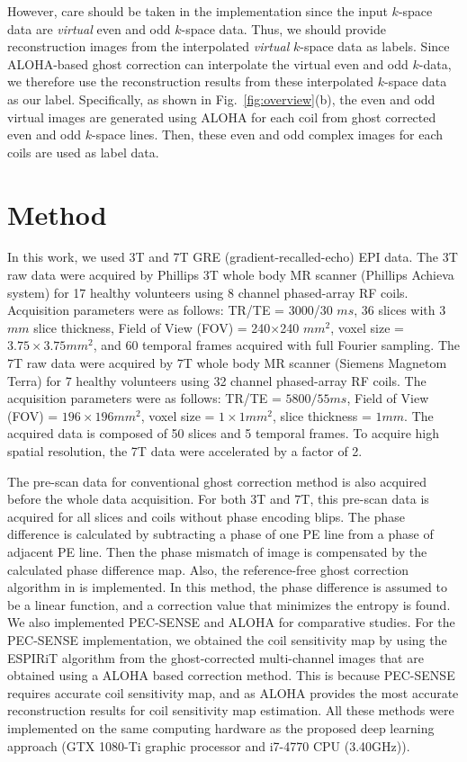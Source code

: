 \documentclass[num-refs]{wiley-article}
\newcommand{\0}{{\boldsymbol{0}}}
\newcommand{\1}{\blmath{1}}
\begin{document}
	However, care should be taken in the implementation since the input $k$-space data are {\em virtual}  even and odd  $k$-space data. Thus, we should provide reconstruction images from the interpolated {\em virtual} $k$-space data as labels. Since ALOHA-based ghost correction can interpolate the virtual even and odd $k$-data, we therefore use the reconstruction results from these interpolated $k$-space data as our label.  Specifically, as shown in Fig.~\ref{fig:overview}(b), the even and odd virtual images are generated using ALOHA for each coil from ghost corrected even and odd $k$-space lines.   Then, these even and odd complex images for each coils  are used as label data. 
	
	
	\section{Method}
	
	
	In this work, we used 3T and 7T GRE (gradient-recalled-echo) EPI data. The 3T raw data were acquired by Phillips 3T whole body MR scanner (Phillips Achieva system) for 17 healthy volunteers using 8 channel phased-array RF coils. Acquisition parameters were as follows: TR/TE = 3000/30 $ms$, 36 slices with 3 $mm$ slice thickness, Field of View (FOV) = 240$\times$240 $mm^2$, voxel size = $3.75\times3.75 mm^2$, and 60 temporal frames acquired with full Fourier sampling. The 7T raw data were acquired by 7T whole body MR scanner (Siemens Magnetom Terra) for 7 healthy volunteers using 32 channel phased-array RF coils. The acquisition parameters were as follows: TR/TE = $5800/55 ms$, Field of View (FOV) = $196\times196 mm^2$, voxel size = $1\times1 mm^2$, slice thickness = $1 mm$. The acquired data is composed of 50 slices and 5 temporal frames. To acquire high spatial resolution, the 7T data were accelerated by a factor of 2.
	
	The pre-scan data for conventional ghost correction method is also acquired before the whole data acquisition. For both 3T and 7T, this pre-scan data is acquired for all slices and coils without phase encoding blips. The phase difference is calculated by subtracting a phase of one PE line from a phase of adjacent PE line. Then the phase mismatch of image is compensated by the calculated phase difference map. 
	Also, the reference-free ghost correction algorithm in \cite{skare2006afast} is implemented. 
	In this method, the phase difference is assumed to be a linear function, and a correction value that minimizes the entropy is found. We also implemented PEC-SENSE \cite{xie2018robust} and ALOHA for comparative studies.  For the PEC-SENSE implementation, we obtained the coil sensitivity map by using the ESPIRiT algorithm \cite{Uecker2014espirit} from the ghost-corrected multi-channel images  that are obtained using a ALOHA based correction method. This
	is because PEC-SENSE requires accurate   coil sensitivity map, and as ALOHA provides the most accurate reconstruction results for
	coil sensitivity map estimation. All these methods were implemented on the same computing hardware as the proposed deep learning approach (GTX 1080-Ti graphic processor and i7-4770 CPU (3.40GHz)).
	
\end{document}
